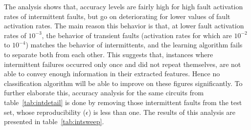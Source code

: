 The analysis shows that, accuracy levels are fairly high for high fault activation rates of intermittent faults, but go on deteriorating for lower values of fault activation rates. The main reason this behavior is that, at lower fault activation rates of $10^{-3}$, the behavior of transient faults (activation rates for which are $10^{-2}$ to $10^{-4}$) matches the behavior of intermittents, and the learning algorithm fails to separate both from each other. This suggests that, instances where intermittent failures occurred only once and did not repeat themselves, are not able to convey enough information in their extracted features. Hence no classification algorithm will be able to improve on these figures significantly. To further elaborate this, accuracy analysis for the same circuits from table~\ref{tab:intdetail} is done by removing those intermittent faults from the test set, whose reproducibility ($\epsilon$) is less than one. The results of this analysis are presented in table~\ref{tab:intsweep}.

